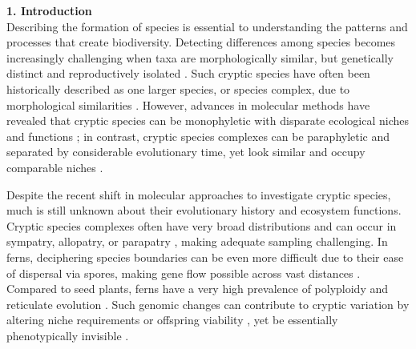 \documentclass[12pt]{article}
\begin{document}
\begin{flushleft}
{\large\textbf{1. Introduction}}\\

Describing the formation of species is essential to understanding the patterns and processes that create biodiversity. Detecting differences among species becomes increasingly challenging when taxa are morphologically similar, but genetically distinct and reproductively isolated \autocite{Bickford2007, Masuyama1992, Paris1989}. Such cryptic species have often been historically described as one larger species, or species complex, due to morphological similarities \autocite{Paris1989}. However, advances in molecular methods have revealed that cryptic species can be monophyletic with disparate ecological niches and functions \autocite{Amato2007, Hebert2004, Sattler2007, Southgate2019}; in contrast, cryptic species complexes can be paraphyletic and separated by considerable evolutionary time, yet look similar and occupy comparable niches \autocite{Amor2014, Cunnington2005}. 

Despite the recent shift in molecular approaches to investigate cryptic species, much is still unknown about their evolutionary history and ecosystem functions. Cryptic species complexes often have very broad distributions \autocite{Der2009, Knowlton1993, Nygren2014} and can occur in sympatry, allopatry, or parapatry \autocite{Bickford2007}, making adequate sampling challenging. In ferns, deciphering species boundaries can be even more difficult due to their ease of dispersal via spores, making gene flow possible across vast distances \autocite{Barrington1993, Tryon1970}. Compared to seed plants, ferns have a very high prevalence of polyploidy and reticulate evolution \autocite{Barrington1989, Paris1989, Otto2000, Otto2000}. Such genomic changes can contribute to cryptic variation by altering niche requirements or offspring viability \autocite{Otto2007, Southgate2019, Masuyama2002}, yet be essentially phenotypically invisible \autocite{Patel2019}.


\end{flushleft}
\end{document}
